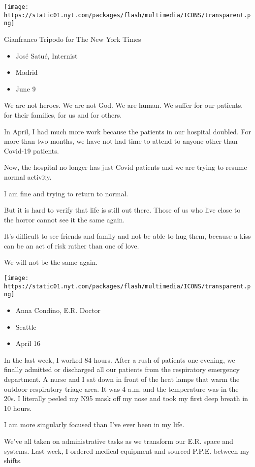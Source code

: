 \texttt{[image: https://static01.nyt.com/packages/flash/multimedia/ICONS/transparent.png]}

Gianfranco Tripodo for The New York Times

\begin{itemize}
\tightlist
\item
  José Satué, Internist
\item
  Madrid
\item
  June 9
\end{itemize}

We are not heroes. We are not God. We are human. We suffer for our
patients, for their families, for us and for others.

In April, I had much more work because the patients in our hospital
doubled. For more than two months, we have not had time to attend to
anyone other than Covid-19 patients.

Now, the hospital no longer has just Covid patients and we are trying to
resume normal activity.

I am fine and trying to return to normal.

But it is hard to verify that life is still out there. Those of us who
live close to the horror cannot see it the same again.

It's difficult to see friends and family and not be able to hug them,
because a kiss can be an act of risk rather than one of love.

We will not be the same again.

\texttt{[image: https://static01.nyt.com/packages/flash/multimedia/ICONS/transparent.png]}

\begin{itemize}
\tightlist
\item
  Anna Condino, E.R. Doctor
\item
  Seattle
\item
  April 16
\end{itemize}

In the last week, I worked 84 hours. After a rush of patients one
evening, we finally admitted or discharged all our patients from the
respiratory emergency department. A nurse and I sat down in front of the
heat lamps that warm the outdoor respiratory triage area. It was 4 a.m.
and the temperature was in the 20s. I literally peeled my N95 mask off
my nose and took my first deep breath in 10 hours.

I am more singularly focused than I've ever been in my life.

We've all taken on administrative tasks as we transform our E.R. space
and systems. Last week, I ordered medical equipment and sourced P.P.E.
between my shifts.

